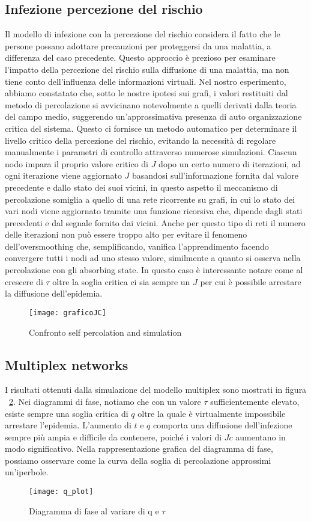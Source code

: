 \subsection{Infezione percezione del rischio}\label{subsec:res-infezione-con-la-percezione-del-rischio}
    Il modello di infezione con la percezione del rischio considera il fatto che le persone possano adottare precauzioni
    per proteggersi da una malattia, a differenza del caso precedente.
    Questo approccio è prezioso per esaminare l'impatto della percezione del rischio sulla diffusione di una malattia,
    ma non tiene conto dell'influenza delle informazioni virtuali.
    Nel nostro esperimento, abbiamo constatato che, sotto le nostre ipotesi sui grafi, i valori restituiti dal metodo di
    percolazione si avvicinano notevolmente a quelli derivati dalla teoria del campo medio, suggerendo un'approssimativa
    presenza di auto organizzazione critica del sistema.
    Questo ci fornisce un metodo automatico per determinare il livello critico della percezione del rischio, evitando la
    necessità di regolare manualmente i parametri di controllo attraverso numerose simulazioni.
    Ciascun nodo impara il proprio valore critico di $J$ dopo un certo numero di iterazioni, ad ogni iterazione
    viene aggiornato $J$ basandosi sull'informazione fornita dal valore precedente e dallo stato dei suoi vicini, in
    questo aspetto il meccanismo di percolazione somiglia a quello di una rete ricorrente su grafi, in cui lo stato dei
    vari nodi viene aggiornato tramite una funzione ricorsiva che, dipende dagli stati precedenti e dal segnale fornito dai
    vicini. Anche per questo tipo di reti il numero delle iterazioni non può essere troppo alto per evitare il fenomeno
    dell'oversmoothing che, semplificando, vanifica l'apprendimento facendo convergere tutti i nodi ad uno stesso valore, similmente a quanto 
    si osserva nella percolazione con gli absorbing state.
    In questo caso è interessante notare come al crescere di $\tau$ oltre la soglia critica ci sia sempre un $J$ per cui è
    possibile arrestare la diffusione dell'epidemia.

    \begin{figure}[H]
        \texttt{[image: graficoJC]}\caption{Confronto self percolation and simulation}
        \label{fig:graficoJC}
    \end{figure}

\subsection{Multiplex networks}\label{subsec:res-multiplex-networks}
    I risultati ottenuti dalla simulazione del modello multiplex sono mostrati in figura ~\ref{fig:diagram_phase}.
    Nei diagrammi di fase, notiamo che con un valore $\tau$ sufficientemente elevato, esiste sempre una soglia critica
    di $q$ oltre la quale è virtualmente impossibile arrestare l'epidemia.
    L'aumento di $t$ e $q$ comporta una diffusione dell'infezione sempre più ampia e difficile da contenere,
    poiché i valori di $Jc$ aumentano in modo significativo.
    Nella rappresentazione grafica del diagramma di fase,
    possiamo osservare come la curva della soglia di percolazione approssimi un'iperbole.

    \begin{figure}[H]
        \texttt{[image: q\_plot]}\caption{Diagramma di fase al variare di q e $\tau$}
        \label{fig:diagram_phase}
    \end{figure}
